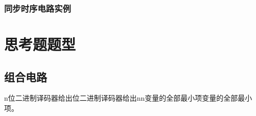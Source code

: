 \documentclass{article}
\begin{document}
	
	
	\subsubsection{同步时序电路实例}
	\section{思考题题型}
	\subsection{组合电路}
	n位二进制译码器给出位二进制译码器给出nn变量的全部最小项变量的全部最小项。\\
\end{document}
